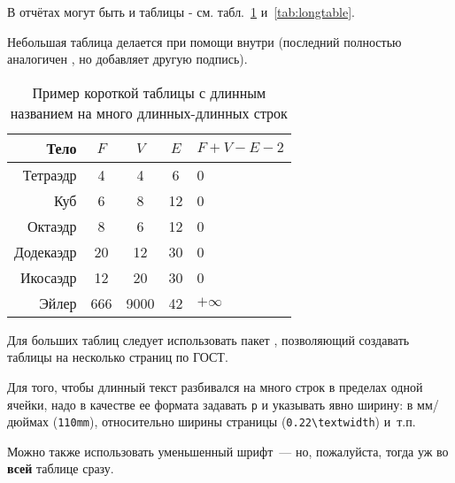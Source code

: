 В отчётах могут быть и таблицы - см. табл.~\ref{tab:tabular} и~\ref{tab:longtable}.

Небольшая таблица делается при помощи  внутри  (последний
полностью аналогичен , но добавляет другую подпись).

\begin{table}[ht]
  \caption{Пример короткой таблицы с длинным названием на много длинных-длинных строк}
  \begin{tabular}{|r|c|c|c|l|}
  \hline
  Тело      & $F$ & $V$  & $E$ & $F+V-E-2$ \\
  \hline
  Тетраэдр  & 4   & 4    & 6   & 0         \\
  Куб       & 6   & 8    & 12  & 0         \\
  Октаэдр   & 8   & 6    & 12  & 0         \\
  Додекаэдр & 20  & 12   & 30  & 0         \\
  Икосаэдр  & 12  & 20   & 30  & 0         \\
  \hline
  Эйлер     & 666 & 9000 & 42  & $+\infty$ \\
  \hline
  \end{tabular}
  \label{tab:tabular}
\end{table}

Для больших таблиц следует использовать пакет , позволяющий создавать
таблицы на несколько страниц по ГОСТ.

Для того, чтобы длинный текст разбивался на много строк в пределах одной ячейки, надо в
качестве ее формата задавать \texttt{p} и указывать явно ширину: в мм/дюймах
(\texttt{110mm}), относительно ширины страницы (\texttt{0.22\textbackslash textwidth})
и~т.п.

Можно также использовать уменьшенный шрифт~--- но, пожалуйста, тогда уж во \textbf{всей}
таблице сразу.

